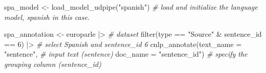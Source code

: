 \documentclass[
  letterpaper,
]{scrbook}
\newenvironment{Shaded}{\begin{snugshade}}{\end{snugshade}}
\newcommand{\AttributeTok}[1]{\textcolor[rgb]{0.00,0.00,0.00}{#1}}
\newcommand{\CommentTok}[1]{\textcolor[rgb]{0.00,0.00,0.00}{\textit{#1}}}
\newcommand{\DecValTok}[1]{\textcolor[rgb]{0.00,0.00,0.00}{#1}}
\newcommand{\FunctionTok}[1]{\textcolor[rgb]{0.00,0.00,0.00}{#1}}
\newcommand{\NormalTok}[1]{\textcolor[rgb]{0.00,0.00,0.00}{#1}}
\newcommand{\OtherTok}[1]{\textcolor[rgb]{0.00,0.00,0.00}{#1}}
\newcommand{\SpecialCharTok}[1]{\textcolor[rgb]{0.00,0.00,0.00}{#1}}
\newcommand{\StringTok}[1]{\textcolor[rgb]{0.00,0.00,0.00}{#1}}
\begin{document}
\begin{Shaded}
\begin{Highlighting}[]
\NormalTok{spa\_model }\OtherTok{\textless{}{-}} \FunctionTok{load\_model\_udpipe}\NormalTok{(}\StringTok{"spanish"}\NormalTok{) }\CommentTok{\# load and initialize the language model, \textquotesingle{}spanish\textquotesingle{} in this case.}

\NormalTok{spa\_annotation }\OtherTok{\textless{}{-}} 
\NormalTok{  europarle }\SpecialCharTok{|\textgreater{}} \CommentTok{\# dataset }
  \FunctionTok{filter}\NormalTok{(type }\SpecialCharTok{==} \StringTok{"Source"} \SpecialCharTok{\&}\NormalTok{ sentence\_id }\SpecialCharTok{==} \DecValTok{6}\NormalTok{) }\SpecialCharTok{|\textgreater{}} \CommentTok{\# select Spanish and sentence\_id 6}
  \FunctionTok{cnlp\_annotate}\NormalTok{(}\AttributeTok{text\_name =} \StringTok{"sentence"}\NormalTok{, }\CommentTok{\# input text (sentence)}
                \AttributeTok{doc\_name =} \StringTok{"sentence\_id"}\NormalTok{) }\CommentTok{\# specify the grouping column (sentence\_id)}
\end{Highlighting}
\end{Shaded}
\end{document}
